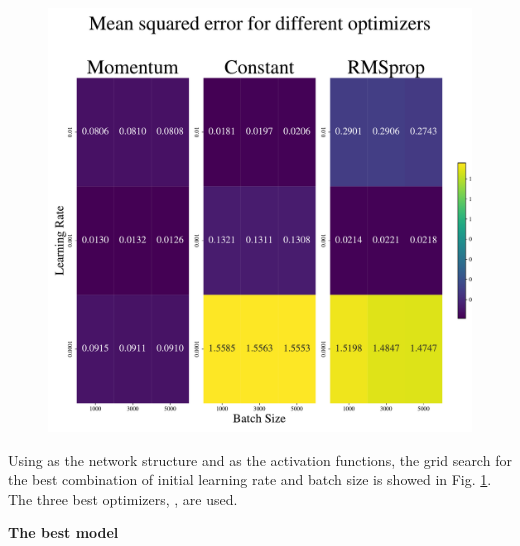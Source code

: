 \begin{figure}
    \centering
    \includegraphics[width=1.0\linewidth]{project_2/figures/Mean squared error_grid_continuous.pdf}
    \caption{}
    \label{fig:grid_franke}
\end{figure}

Using  as the network structure and  as the activation functions, the grid search for the best combination of initial learning rate and batch size is showed in Fig. \ref{fig:grid_franke}. The three best optimizers, , are used. 

\textbf{The best model}

